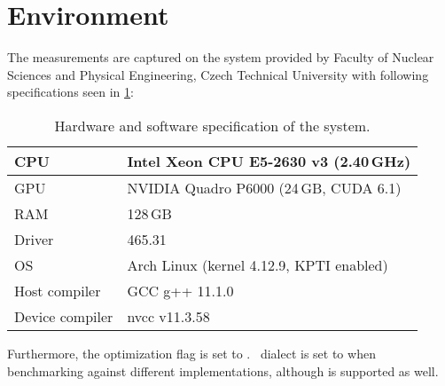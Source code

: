 \section{Environment}

The measurements are captured on the  system provided by Faculty of Nuclear Sciences and Physical Engineering, Czech Technical University with following specifications seen in \cref{table:env-gp1}:

\begin{table}[H]
  \centering
  \begin{tabular}{ | l | l | }
    \hline
    CPU             & Intel Xeon CPU E5-2630 v3 (2.40\,GHz)    \\
    \hline
    GPU             & NVIDIA Quadro P6000 (24\,GB, CUDA 6.1)   \\
    \hline
    RAM             & 128\,GB                                  \\
    \hline
    Driver          & 465.31                                   \\
    \hline
    OS              & Arch Linux (kernel 4.12.9, KPTI enabled) \\
    \hline
    Host compiler   & GCC g++ 11.1.0                           \\
    \hline
    Device compiler & nvcc v11.3.58                            \\
    \hline
  \end{tabular}
  \caption{Hardware and software specification of the  system.}
  \label{table:env-gp1}
\end{table}

Furthermore, the optimization flag is set to . \CC\ dialect is set to  when benchmarking against different implementations, although  is supported as well.